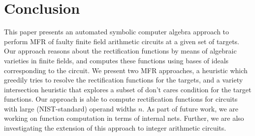 \section{Conclusion}\label{sec:conc}
This paper presents an automated symbolic computer algebra approach to 
perform MFR of faulty finite field arithmetic circuits at a given set of targets.
Our approach reasons about the rectification functions by means of
algebraic varieties in finite fields, and computes these functions
using \Grobner bases of ideals corresponding to the circuit. 
We present two MFR approaches, a heuristic which greedily tries to
resolve the rectification functions for the targets, and 
a variety intersection heuristic that explores a subset of 
don't cares condition for the target functions. Our approach is
able to compute rectification functions for circuits with large
(NIST-standard) operand widths $n$. 
As part of future work, we are working on function computation in
terms of internal nets. Further, we are also investigating the
extension of this approach to integer arithmetic circuits.



